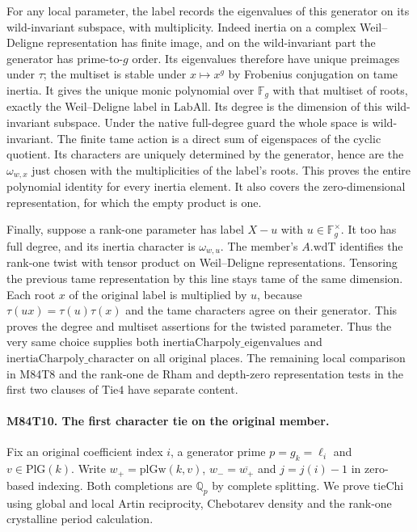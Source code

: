 For any local parameter, the label records the eigenvalues
of this generator on its wild-invariant subspace, with
multiplicity. Indeed inertia on a complex Weil--Deligne
representation has finite image, and on the wild-invariant
part the generator has prime-to-$g$ order. Its eigenvalues
therefore have unique preimages under $\tau$; the multiset
is stable under $x\mapsto x^g$ by Frobenius conjugation
on tame inertia. It gives the unique monic polynomial over
$\mathbb F_g$ with that multiset of roots, exactly the
Weil--Deligne label in $\mathrm{LabAll}$. Its degree is
the dimension of this wild-invariant subspace. Under the
native full-degree guard the whole space is wild-invariant.
The finite tame action is a direct sum of eigenspaces of
the cyclic quotient. Its characters are uniquely determined
by the generator, hence are the $\omega_{w,x}$ just chosen
with the multiplicities of the label's roots. This proves
the entire polynomial identity for every inertia element.
It also covers the zero-dimensional representation, for
which the empty product is one.

Finally, suppose a rank-one parameter has label $X-u$ with
$u\in\mathbb F_g^\times$. It too has full degree, and its
inertia character is $\omega_{w,u}$. The member's
$A.\mathrm{wdT}$ identifies the rank-one twist with tensor
product on Weil--Deligne representations. Tensoring the
previous tame representation by this line stays tame of the
same dimension. Each root $x$ of the original label is
multiplied by $u$, because $\tau(ux)=\tau(u)\tau(x)$ and
the tame characters agree on their generator. This proves
the degree and multiset assertions for the twisted parameter.
Thus the very same choice supplies both
$\mathrm{inertiaCharpoly\_eigenvalues}$ and
$\mathrm{inertiaCharpoly\_character}$ on all original places.
The remaining local comparison in M84T8 and the rank-one
de Rham and depth-zero representation tests in the first
two clauses of $\mathrm{Tie4}$ have separate content.

\paragraph{M84T10. The first character tie on the original member.}
Fix an original coefficient index $i$, a generator prime $p=g_k=\ell_i$
and $v\in\mathrm{PlG}(k)$. Write $w_+=\mathrm{plGw}(k,v)$,
$w_-=\overline{w_+}$ and $j=j(i)-1$ in zero-based indexing.
Both completions are $\mathbb Q_p$ by complete splitting. We prove
$\mathrm{tieChi}$ using global and local Artin reciprocity, Chebotarev
density and the rank-one crystalline period calculation.

